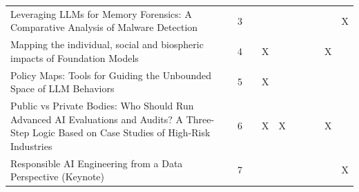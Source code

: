 \begin{landscape}
\begin{longtable}{|p{17cm}|c|c|c|c|c|c|c|c|c|}
		Leveraging LLMs for Memory Forensics: A Comparative Analysis of Malware Detection                                                                       & 3           &                                    &                                                           &                                                       &                                                            &                                           &                                              &                                                    & X                                  \\
		Mapping the individual, social and biospheric impacts of Foundation Models                                                                              & 4           &                                    & X                                                         &                                                       &                                                            &                                           &                                              & X                                                  &                                    \\
		Policy Maps: Tools for Guiding the Unbounded Space of LLM Behaviors                                                                                     & 5           &                                    & X                                                         &                                                       &                                                            &                                           &                                              &                                                    &                                    \\
		Public vs Private Bodies: Who Should Run Advanced AI Evaluations and Audits? A Three-Step Logic Based on Case Studies of High-Risk Industries           & 6           &                                    & X                                                         & X                                                     &                                                            &                                           &                                              & X                                                  &                                    \\
		Responsible AI Engineering from a Data Perspective (Keynote)                                                                                            & 7           &                                    &                                                           &                                                       &                                                            &                                           &                                              &                                                    & X                                  \\

\end{longtable}
\end{landscape}
